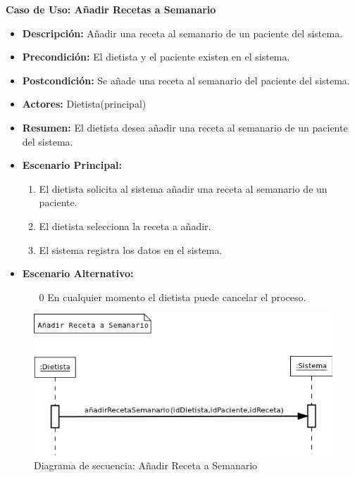 \textbf{Caso de Uso: Añadir Recetas a Semanario}
\begin{itemize}
\item \textbf{Descripción:} Añadir una receta al semanario de un paciente del sistema.
\item \textbf{Precondición:} El dietista y el paciente existen en el sistema.
\item \textbf{Postcondición:} Se añade una receta al semanario del paciente del sistema.
\item \textbf{Actores:} Dietista(principal)
\item \textbf{Resumen:} El dietista desea añadir una receta al semanario de un paciente del sistema.
\item \textbf{Escenario Principal:}
\begin{enumerate}
\item El dietista solicita al sistema añadir una receta al semanario de un paciente.
\item El dietista selecciona la receta a añadir.
\item El sistema registra los datos en el sistema.
\end{enumerate}
\item \textbf{Escenario Alternativo:}
\begin{enumerate}
\item[0] En cualquier momento el dietista puede cancelar el proceso.
\end{enumerate}
\end{itemize}
\begin{figure}[H]
  \label{ds_anadirrecetasemanario}
  \begin{center}
    \includegraphics[scale=0.7]{../img/DS_AnadirRecetaSemanario.png}
  \end{center}
  \caption{Diagrama de secuencia: Añadir Receta a Semanario}
\end{figure}
